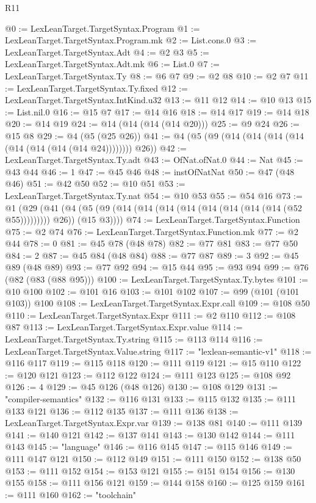 \begin{lexlean}{R11}
\begin{coremodule}
{{{{{{{{{{{{{{{{{{{{{{{{{{{{{{{{{{{{{{{{{{{{{{{{{{{{{{{{{{{{{{{{{{{{{{{{{{{{{{{{{{@0 := LexLeanTarget.TargetSyntax.Program
@1 := LexLeanTarget.TargetSyntax.Program.mk
@2 := List.cons.{0}
@3 := LexLeanTarget.TargetSyntax.Adt
@4 := @2 @3
@5 := LexLeanTarget.TargetSyntax.Adt.mk
@6 := List.{0}
@7 := LexLeanTarget.TargetSyntax.Ty
@8 := @6 @7
@9 := @2 @8
@10 := @2 @7
@11 := LexLeanTarget.TargetSyntax.Ty.fixed
@12 := LexLeanTarget.TargetSyntax.IntKind.u32
@13 := @11 @12
@14 := @10 @13
@15 := List.nil.{0}
@16 := @15 @7
@17 := @14 @16
@18 := @14 @17
@19 := @14 @18
@20 := @14 @19
@24 := @14 (@14 (@14 (@14 @20)))
@25 := @9 @24
@26 := @15 @8
@29 := @4 (@5 (@25 @26))
@41 := @4 (@5 (@9 (@14 (@14 (@14 (@14 (@14 (@14 (@14 (@14 @24)))))))) @26))
@42 := LexLeanTarget.TargetSyntax.Ty.adt
@43 := OfNat.ofNat.{0}
@44 := Nat
@45 := @43 @44
@46 := 1
@47 := @45 @46
@48 := instOfNatNat
@50 := @47 (@48 @46)
@51 := @42 @50
@52 := @10 @51
@53 := LexLeanTarget.TargetSyntax.Ty.nat
@54 := @10 @53
@55 := @54 @16
@73 := @1
    (@29
      (@41 (@4 (@5 (@9 (@14 (@14 (@14 (@14 (@14 (@14 (@14 (@14 (@52 @55))))))))) @26)) (@15 @3))))
@74 := LexLeanTarget.TargetSyntax.Function
@75 := @2 @74
@76 := LexLeanTarget.TargetSyntax.Function.mk
@77 := @2 @44
@78 := 0
@81 := @45 @78 (@48 @78)
@82 := @77 @81
@83 := @77 @50
@84 := 2
@87 := @45 @84 (@48 @84)
@88 := @77 @87
@89 := 3
@92 := @45 @89 (@48 @89)
@93 := @77 @92
@94 := @15 @44
@95 := @93 @94
@99 := @76 (@82 (@83 (@88 @95)))
@100 := LexLeanTarget.TargetSyntax.Ty.bytes
@101 := @10 @100
@102 := @101 @16
@103 := @101 @102
@107 := @99 (@101 (@101 @103)) @100
@108 := LexLeanTarget.TargetSyntax.Expr.call
@109 := @108 @50
@110 := LexLeanTarget.TargetSyntax.Expr
@111 := @2 @110
@112 := @108 @87
@113 := LexLeanTarget.TargetSyntax.Expr.value
@114 := LexLeanTarget.TargetSyntax.Ty.string
@115 := @113 @114
@116 := LexLeanTarget.TargetSyntax.Value.string
@117 := "lexlean-semantic-v1"
@118 := @116 @117
@119 := @115 @118
@120 := @111 @119
@121 := @15 @110
@122 := @120 @121
@123 := @112 @122
@124 := @111 @123
@125 := @108 @92
@126 := 4
@129 := @45 @126 (@48 @126)
@130 := @108 @129
@131 := "compiler-semantics"
@132 := @116 @131
@133 := @115 @132
@135 := @111 @133 @121
@136 := @112 @135
@137 := @111 @136
@138 := LexLeanTarget.TargetSyntax.Expr.var
@139 := @138 @81
@140 := @111 @139
@141 := @140 @121
@142 := @137 @141
@143 := @130 @142
@144 := @111 @143
@145 := "language"
@146 := @116 @145
@147 := @115 @146
@149 := @111 @147 @121
@150 := @112 @149
@151 := @111 @150
@152 := @138 @50
@153 := @111 @152
@154 := @153 @121
@155 := @151 @154
@156 := @130 @155
@158 := @111 @156 @121
@159 := @144 @158
@160 := @125 @159
@161 := @111 @160
@162 := "toolchain"
}}}}}}}}}}}}}}}}}}}}}}}}}}}}}}}}}}}}}}}}}}}}}}}}}}}}}}}}}}}}}}}}}}}}}}}}}}}}}}}}}}
\end{coremodule}
\end{lexlean}
